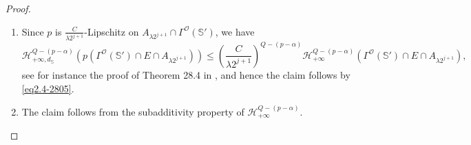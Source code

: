 \documentclass[10pt]{amsart}
\numberwithin{equation}{section}
\begin{document}
\begin{proof}
\begin{enumerate}[label=\arabic*.]
  
		\item 
		{
		Since $p$ is $\frac{C}{\lambda 2^{j+1}}$-Lipschitz on $A_{\lambda 2^{j+1}}\cap \Gamma^{\mathcal O}(\mathbb S')$, we have 
  \[
  \mathcal H^{Q-(p-\alpha)}_{+\infty, d_{\mathbb S}} (p(\Gamma^{\mathcal O}(\mathbb S')\cap E\cap A_{\lambda 2^{j+1}}))\leq \left(\frac{C}{\lambda 2^{j+1}}\right)^{Q-(p-\alpha)} \mathcal H^{Q-(p-\alpha)}_{+\infty}(\Gamma^{\mathcal O}(\mathbb S')\cap E\cap A_{\lambda 2^{j+1}}),
  \]
  see for instance the proof of Theorem 28.4 in \cite{Y15}, and hence the claim follows by  \eqref{eq2.4-2805}.
  }
		\item The claim follows from the subadditivity property of  $\mathcal H^{Q-(p-\alpha)}_{+\infty}$.\qedhere
	\end{enumerate}
	 \end{proof}
\end{document}
